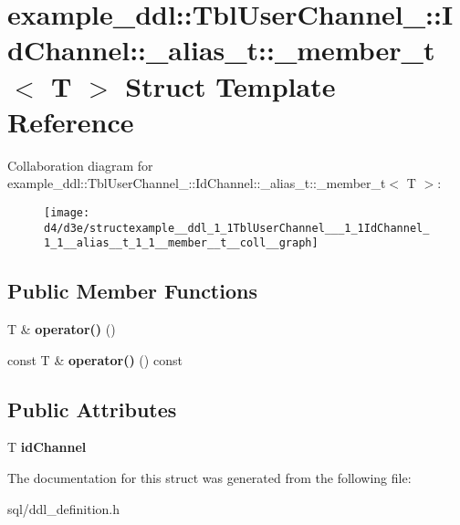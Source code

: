\hypertarget{structexample__ddl_1_1TblUserChannel___1_1IdChannel_1_1__alias__t_1_1__member__t}{}\section{example\+\_\+ddl\+:\+:Tbl\+User\+Channel\+\_\+\+:\+:Id\+Channel\+:\+:\+\_\+alias\+\_\+t\+:\+:\+\_\+member\+\_\+t$<$ T $>$ Struct Template Reference}
\label{structexample__ddl_1_1TblUserChannel___1_1IdChannel_1_1__alias__t_1_1__member__t}


Collaboration diagram for example\+\_\+ddl\+:\+:Tbl\+User\+Channel\+\_\+\+:\+:Id\+Channel\+:\+:\+\_\+alias\+\_\+t\+:\+:\+\_\+member\+\_\+t$<$ T $>$\+:
\nopagebreak
\begin{figure}[H]
\begin{center}
\leavevmode
\texttt{[image: d4/d3e/structexample\_\_ddl\_1\_1TblUserChannel\_\_\_1\_1IdChannel\_1\_1\_\_alias\_\_t\_1\_1\_\_member\_\_t\_\_coll\_\_graph]}
\end{center}
\end{figure}
\subsection*{Public Member Functions}
\begin{DoxyCompactItemize}
\item 
\hypertarget{structexample__ddl_1_1TblUserChannel___1_1IdChannel_1_1__alias__t_1_1__member__t_a43ad3c08cdeb46373de0aa44bc3632e6}{}T \& {\bfseries operator()} ()\label{structexample__ddl_1_1TblUserChannel___1_1IdChannel_1_1__alias__t_1_1__member__t_a43ad3c08cdeb46373de0aa44bc3632e6}

\item 
\hypertarget{structexample__ddl_1_1TblUserChannel___1_1IdChannel_1_1__alias__t_1_1__member__t_a06d93b876d538cedc102db46d03d2cbe}{}const T \& {\bfseries operator()} () const \label{structexample__ddl_1_1TblUserChannel___1_1IdChannel_1_1__alias__t_1_1__member__t_a06d93b876d538cedc102db46d03d2cbe}

\end{DoxyCompactItemize}
\subsection*{Public Attributes}
\begin{DoxyCompactItemize}
\item 
\hypertarget{structexample__ddl_1_1TblUserChannel___1_1IdChannel_1_1__alias__t_1_1__member__t_a800bfd78c7a0694b02f5ebb4c9a4ac68}{}T {\bfseries id\+Channel}\label{structexample__ddl_1_1TblUserChannel___1_1IdChannel_1_1__alias__t_1_1__member__t_a800bfd78c7a0694b02f5ebb4c9a4ac68}

\end{DoxyCompactItemize}


The documentation for this struct was generated from the following file\+:\begin{DoxyCompactItemize}
\item 
sql/ddl\+\_\+definition.\+h\end{DoxyCompactItemize}
